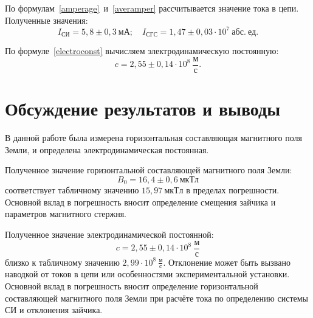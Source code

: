 \documentclass[a4paper, 12pt]{article}
\begin{document}
По формулам~\eqref{amperage}~и~\eqref{averamper} рассчитывается значение тока в цепи. Полученные значения:
$$I_{СИ} = 5,8\pm0,3~мА; \quad I_{СГС} = 1,47\pm0,03\cdot10^7~абс.~ед.$$

По формуле~\eqref{electroconst} вычисляем электродинамическую постоянную:
$$c = 2,55\pm0,14\cdot10^8~\frac{м}{с}.$$

\section{Обсуждение результатов и выводы}

В данной работе была измерена горизонтальная составляющая магнитного поля Земли, и определена электродинамическая постоянная.

Полученное значение горизонтальной составляющей магнитного поля Земли:
$$\boxed{B_0 = 16,4\pm0,6~мкТл}$$
соответствует табличному значению $15,97~мкТл$ в пределах погрешности. Основной вклад в погрешность вносит определение смещения зайчика и параметров магнитного стержня.

Полученное значение электродинамической постоянной:
$$\boxed{c = 2,55\pm0,14\cdot10^8~\frac{м}{с}}$$
близко к табличному значению $2,99\cdot10^8~\frac{м}{с}$. Отклонение может быть вызвано наводкой от токов в цепи или особенностями экспериментальной установки. Основной вклад в погрешность вносит определение горизонтальной составляющей магнитного поля Земли при расчёте тока по определению системы СИ и отклонения зайчика.
\end{document}

